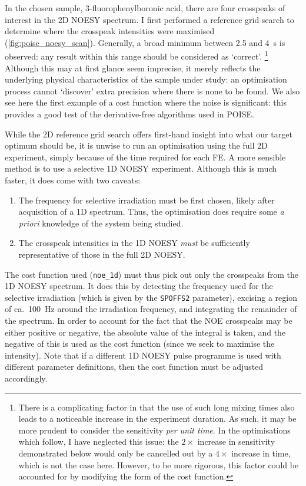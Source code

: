 In the chosen sample, 3-fluorophenylboronic acid, there are four crosspeaks of interest in the 2D NOESY spectrum.
I first performed a reference grid search to determine where the crosspeak intensities were maximised (\cref{fig:poise_noesy_scan}).
Generally, a broad minimum between 2.5 and \qty{4}{\s} is observed: any result within this range should be considered as `correct'.%
\footnote{There is a complicating factor in that the use of such long mixing times also leads to a noticeable increase in the experiment duration.
As such, it may be more prudent to consider the sensitivity \textit{per unit time}.
In the optimisations which follow, I have neglected this issue: the $2\times$ increase in sensitivity demonstrated below would only be cancelled out by a $4\times$ increase in time, which is not the case here.
However, to be more rigorous, this factor could be accounted for by modifying the form of the cost function.}
Although this may at first glance seem imprecise, it merely reflects the underlying physical characteristics of the sample under study: an optimisation process cannot `discover' extra precision where there is none to be found.
We also see here the first example of a cost function where the noise is significant: this provides a good test of the derivative-free algorithms used in POISE.

While the 2D reference grid search offers first-hand insight into what our target optimum should be, it is unwise to run an optimisation using the full 2D experiment, simply because of the time required for each FE.
A more sensible method is to use a selective 1D NOESY experiment.
Although this is much faster, it does come with two caveats:
\begin{enumerate}
    \item The frequency for selective irradiation must be first chosen, likely after acquisition of a 1D \proton{} spectrum.
        Thus, the optimisation does require some \textit{a priori} knowledge of the system being studied.
    \item The crosspeak intensities in the 1D NOESY \textit{must} be sufficiently representative of those in the full 2D NOESY.
\end{enumerate}

The cost function used (\texttt{noe\_1d}) must thus pick out only the crosspeaks from the 1D NOESY spectrum.
It does this by detecting the frequency used for the selective irradiation (which is given by the \texttt{SPOFFS2} parameter), excising a region of ca.\ \qty{100}{\Hz} around the irradiation frequency, and integrating the remainder of the spectrum.
In order to account for the fact that the NOE crosspeaks may be either positive or negative, the absolute value of the integral is taken, and the negative of this is used as the cost function (since we seek to maximise the intensity).
Note that if a different 1D NOESY pulse programme is used with different parameter definitions, then the cost function must be adjusted accordingly.


